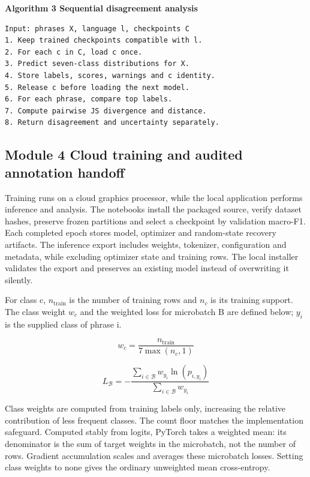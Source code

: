 \documentclass[conference]{IEEEtran}
\begin{document}
\noindent\begin{minipage}{\columnwidth}
\textbf{Algorithm 3 Sequential disagreement analysis}
\begin{lstlisting}
Input: phrases X, language l, checkpoints C
1. Keep trained checkpoints compatible with l.
2. For each c in C, load c once.
3. Predict seven-class distributions for X.
4. Store labels, scores, warnings and c identity.
5. Release c before loading the next model.
6. For each phrase, compare top labels.
7. Compute pairwise JS divergence and distance.
8. Return disagreement and uncertainty separately.
\end{lstlisting}
\end{minipage}

\subsection{Module 4 Cloud training and audited annotation handoff}

Training runs on a cloud graphics processor, while the local application performs inference and analysis. The notebooks install the packaged source, verify dataset hashes, preserve frozen partitions and select a checkpoint by validation macro-F1. Each completed epoch stores model, optimizer and random-state recovery artifacts. The inference export includes weights, tokenizer, configuration and metadata, while excluding optimizer state and training rows. The local installer validates the export and preserves an existing model instead of overwriting it silently.

For class c, \(n_{\mathrm{train}}\) is the number of training rows and \(n_c\) is its training support. The class weight \(w_c\) and the weighted loss for microbatch B are defined below; \(y_i\) is the supplied class of phrase i.

\begin{equation}
w_c=\frac{n_{\mathrm{train}}}{7\max(n_c,1)}
\label{eq:class_weights}
\end{equation}

\begin{equation}
L_{\mathcal B}=-\frac{\sum_{i\in\mathcal B}w_{y_i}\ln(p_{i,y_i})}{\sum_{i\in\mathcal B}w_{y_i}}
\label{eq:weighted_ce}
\end{equation}

Class weights are computed from training labels only, increasing the relative contribution of less frequent classes. The count floor matches the implementation safeguard. Computed stably from logits, PyTorch takes a weighted mean: its denominator is the sum of target weights in the microbatch, not the number of rows. Gradient accumulation scales and averages these microbatch losses. Setting class weights to none gives the ordinary unweighted mean cross-entropy.
\end{document}
